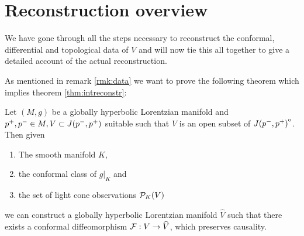 \section{Reconstruction overview}
We have gone through all the steps necessary to reconstruct the conformal, differential and topological data of $V$ and will now tie this all together to give a detailed account of the actual reconstruction.

As mentioned in remark \ref{rmk:data} we want to prove the following theorem which implies theorem \ref{thm:intreconstr}:
\begin{theorem}
    Let $(M,g)$ be a globally hyperbolic Lorentzian manifold and $p^+,p^-\in M, V\subset J(p^-,p^+)$ suitable such that $V$ is an open subset of ${\kern0ptJ(p^-,p^+)}^{\mathrm{o}}$. Then given 
    \begin{enumerate}[label={\textnormal{(\arabic*)}}]
        \item The smooth manifold $K$,
        \item the conformal class of $g\rvert_K$ and
        \item the set of light cone observations ${\mathcal{P}}_K(V)$
    \end{enumerate}
    we can construct a globally hyperbolic Lorentzian manifold $\widehat{V}$ such that there exists a conformal diffeomorphism $\mathcal{F}:V\to \widehat{V}$, which preserves causality.
\end{theorem}
